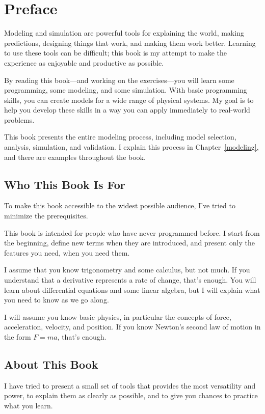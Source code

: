 \chapter*{Preface}
\adjustmtc

Modeling and simulation are powerful tools for explaining the world, making predictions, designing things that work, and making them work better.  Learning to use these tools can be difficult; this book is my attempt to make the experience as enjoyable and productive as possible.

By reading this book---and working on the exercises---you will learn some programming, some modeling, and some simulation.
With basic programming skills, you can create models for a wide range of physical systems.
My goal is to help you develop these skills in a way you can apply immediately to real-world problems.

This book presents the entire modeling process, including model selection, analysis, simulation, and validation.  I explain this process in Chapter~\ref{modeling}, and there are examples throughout the book.

\section{Who This Book Is For}

To make this book accessible to the widest possible audience, I've tried to minimize the prerequisites.

This book is intended for people who have never programmed before.  I start from the beginning, define new terms when they are introduced, and present only the features you need, when you need them.

I assume that you know trigonometry and some calculus, but not much.  If you understand that a derivative represents a rate of change, that's enough.  You will learn about differential equations and some linear algebra, but I will explain what you need to know as we go along.

I will assume you know basic physics, in particular the concepts of force, acceleration, velocity, and position.  If you know Newton's second law of motion in the form $F = m a$, that's enough.

\section{About This Book}

I have tried to present a small set of tools that provides the most versatility and power, to explain them as clearly as possible, and to give you chances to practice what you learn.

